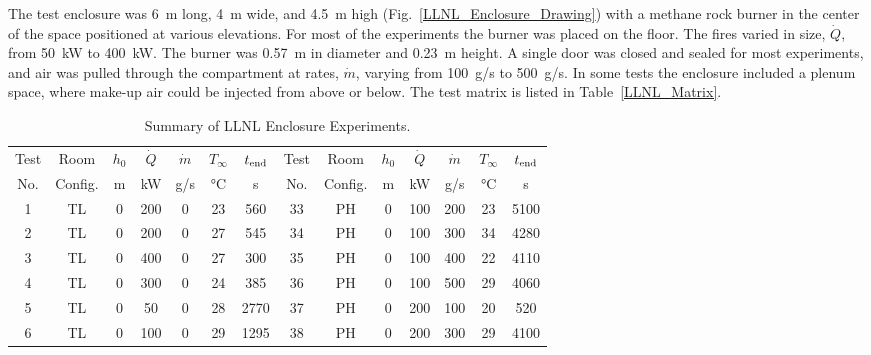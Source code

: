 The test enclosure was 6~m long, 4~m wide, and 4.5~m high (Fig.~\ref{LLNL_Enclosure_Drawing}) with a methane rock burner in the center of the space positioned at various elevations. For most of the experiments the burner was placed on the floor. The fires varied in size, $\dot{Q}$, from 50~kW to 400~kW. The burner was 0.57~m in diameter and 0.23~m height. A single door was closed and sealed for most experiments, and air was pulled through the compartment at rates, $\dot{m}$, varying from 100~g/s to 500~g/s. In some tests the enclosure included a plenum space, where make-up air could be injected from above or below. The test matrix is listed in Table~\ref{LLNL_Matrix}.

\begin{table}[p]
\centering
\caption[Summary of LLNL Enclosure Experiments]{Summary of LLNL Enclosure Experiments.}
\begin{tabular}{|c|c|c|c|c|c|c||c|c|c|c|c|c|c|}
\hline
Test & Room    & $h_0$ &  $\dot{Q}$ & $\dot{m}$ & $T_\infty$ & $t_{\rm end}$  &   Test & Room    & $h_0$ &  $\dot{Q}$ & $\dot{m}$ & $T_\infty$ & $t_{\rm end}$  \\
No.  & Config. & m     &  kW        & g/s       & \unit{\degreeCelsius}  & s              &   No.  & Config. & m     &  kW        & g/s       & \unit{\degreeCelsius}  & s           \\ \hline \hline
1    & TL      & 0     & 200        & 0         & 23         & 560            &   33   & PH      & 0     & 100        & 200       & 23         & 5100        \\ \hline
2    & TL      & 0     & 200        & 0         & 27         & 545            &   34   & PH      & 0     & 100        & 300       & 34         & 4280        \\ \hline
3    & TL      & 0     & 400        & 0         & 27         & 300            &   35   & PH      & 0     & 100        & 400       & 22         & 4110        \\ \hline
4    & TL      & 0     & 300        & 0         & 24         & 385            &   36   & PH      & 0     & 100        & 500       & 29         & 4060        \\ \hline
5    & TL      & 0     & 50         & 0         & 28         & 2770           &   37   & PH      & 0     & 200        & 100       & 20         & 520         \\ \hline
6    & TL      & 0     & 100        & 0         & 29         & 1295           &   38   & PH      & 0     & 200        & 300       & 29         & 4100        \\ \hline

\end{tabular}
\end{table}
